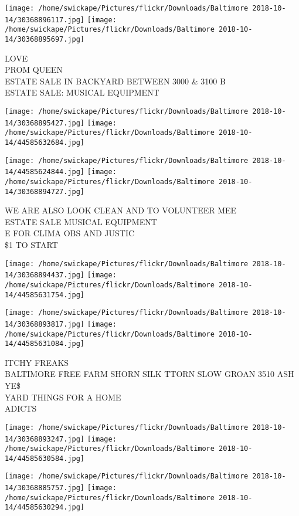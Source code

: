 \documentclass[10pt,letterpaper]{article}
\begin{document}
\texttt{[image: /home/swickape/Pictures/flickr/Downloads/Baltimore 2018-10-14/30368896117.jpg]}
\texttt{[image: /home/swickape/Pictures/flickr/Downloads/Baltimore 2018-10-14/30368895697.jpg]}

LOVE\\
PROM QUEEN\\
ESTATE SALE IN BACKYARD BETWEEN 3000 \& 3100 B\\
ESTATE SALE: MUSICAL EQUIPMENT\\
\pagebreak

\texttt{[image: /home/swickape/Pictures/flickr/Downloads/Baltimore 2018-10-14/30368895427.jpg]}
\texttt{[image: /home/swickape/Pictures/flickr/Downloads/Baltimore 2018-10-14/44585632684.jpg]}

\texttt{[image: /home/swickape/Pictures/flickr/Downloads/Baltimore 2018-10-14/44585624844.jpg]}
\texttt{[image: /home/swickape/Pictures/flickr/Downloads/Baltimore 2018-10-14/30368894727.jpg]}

WE ARE ALSO LOOK CLEAN AND TO VOLUNTEER MEE\\
ESTATE SALE MUSICAL EQUIPMENT\\
E FOR CLIMA OBS AND JUSTIC\\
\$1 TO START\\
\pagebreak

\texttt{[image: /home/swickape/Pictures/flickr/Downloads/Baltimore 2018-10-14/30368894437.jpg]}
\texttt{[image: /home/swickape/Pictures/flickr/Downloads/Baltimore 2018-10-14/44585631754.jpg]}

\texttt{[image: /home/swickape/Pictures/flickr/Downloads/Baltimore 2018-10-14/30368893817.jpg]}
\texttt{[image: /home/swickape/Pictures/flickr/Downloads/Baltimore 2018-10-14/44585631084.jpg]}

ITCHY FREAKS\\
BALTIMORE FREE FARM SHORN SILK TTORN SLOW GROAN 3510 ASH YE\$\\
YARD THINGS FOR A HOME\\
ADICTS\\
\pagebreak

\texttt{[image: /home/swickape/Pictures/flickr/Downloads/Baltimore 2018-10-14/30368893247.jpg]}
\texttt{[image: /home/swickape/Pictures/flickr/Downloads/Baltimore 2018-10-14/44585630584.jpg]}

\texttt{[image: /home/swickape/Pictures/flickr/Downloads/Baltimore 2018-10-14/30368885757.jpg]}
\texttt{[image: /home/swickape/Pictures/flickr/Downloads/Baltimore 2018-10-14/44585630294.jpg]}
\end{document}
